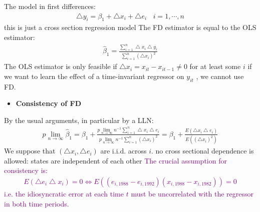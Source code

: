\documentclass[a4paper,twoside,11pt]{article}
\begin{document}
\noindent The model in first differences:
\begin{equation*}
\begin{aligned}
\bigtriangleup y_i = \beta_1 + \bigtriangleup x_i+ \bigtriangleup e_i \ \ \ \ i=1,\cdots , n
\end{aligned}
\end{equation*}
this is just a cross section regression model
\newline
\newline
The FD estimator is equal to the OLS estimator:
\begin{equation*}
\begin{aligned}
\hat{\beta}_1 = \frac{\sum^n_{i=1} \bigtriangleup x_i \bigtriangleup y_i}{\sum^n_{i=1} (\bigtriangleup x_i)^2}
\end{aligned}
\end{equation*}
\newline
\textcolor{NavyBlue}{The OLS estimator is only feasible if $\bigtriangleup x_i = x_{it} - x_{it-1} \ne 0$ for at least some $i$}
\newline
if we want to learn the effect of a time-invariant regressor on $y_{it}$ , we
cannot use FD.
\begin{itemize}
    \item \textbf{Consistency of FD}
\end{itemize}
By the usual arguments, in particular by a LLN:
\begin{equation*}
\begin{aligned}
p \underset{n \rightarrow \infty}{\lim} \hat{\beta}_1 = \beta_1 + \frac{p \lim_{n \rightarrow \infty}n^{-1} \sum^n_{i=1} \bigtriangleup x_i \bigtriangleup e_i }{p \lim_{n \rightarrow \infty} n^{-1} \sum^n_{i=1} (\bigtriangleup x_i)^2} = \beta_1 + \frac{E(\bigtriangleup x_i \bigtriangleup e_i)}{E((\bigtriangleup x_i)^2)}
\end{aligned}
\end{equation*}
We suppose that $(\bigtriangleup x_i, \bigtriangleup e_i )$ are i.i.d. across $i$. \newline
no cross sectional dependence is allowed: states are independent of each other
\newline
\textcolor{Purple}{The crucial assumption for consistency is: 
\begin{equation*}
\begin{aligned}
E( \bigtriangleup e_i \bigtriangleup x_i ) = 0 \Leftrightarrow E((e_{i,1988} - e_{i,1992})(x_{i,1988} - x_{i,1982})) = 0
\end{aligned}
\end{equation*}
i.e. the idiosyncratic error at each time $t$ must be uncorrelated with the regressor in both time periods.}
\end{document}

